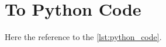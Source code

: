 \section{To Python Code}
\label{sec:to_python_code} %

Here the reference to the \cref{lst:python_code}.
